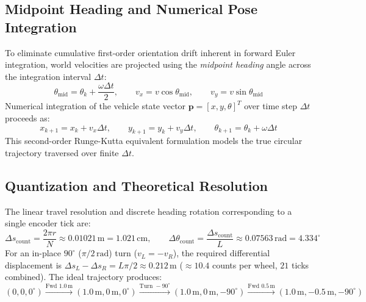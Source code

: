 \documentclass[11pt,a4paper]{article}
\begin{document}
\subsection{Midpoint Heading and Numerical Pose Integration}
To eliminate cumulative first-order orientation drift inherent in forward Euler integration, world velocities are projected using the \emph{midpoint heading} angle across the integration interval $\Delta t$:
\begin{equation}
    \theta_{\text{mid}} = \theta_k + \frac{\omega \Delta t}{2}, \qquad v_x = v \cos \theta_{\text{mid}}, \qquad v_y = v \sin \theta_{\text{mid}}
    \label{eq_midpoint}
\end{equation}
Numerical integration of the vehicle state vector $\mathbf{p} = [x, y, \theta]^T$ over time step $\Delta t$ proceeds as:
\begin{equation}
    x_{k+1} = x_k + v_x \Delta t, \qquad y_{k+1} = y_k + v_y \Delta t, \qquad \theta_{k+1} = \theta_k + \omega \Delta t
    \label{eq_pose_update}
\end{equation}
This second-order Runge-Kutta equivalent formulation models the true circular trajectory traversed over finite $\Delta t$.

\subsection{Quantization and Theoretical Resolution}
The linear travel resolution and discrete heading rotation corresponding to a single encoder tick are:
\begin{equation}
    \Delta s_{\text{count}} = \frac{2\pi r}{N} \approx 0.01021\,\text{m} = 1.021\,\text{cm}, \qquad \Delta \theta_{\text{count}} = \frac{\Delta s_{\text{count}}}{L} \approx 0.07563\,\text{rad} = 4.334^\circ
    \label{eq_resolution}
\end{equation}
For an in-place $90^\circ$ ($\pi/2\,\text{rad}$) turn ($v_L = -v_R$), the required differential displacement is $\Delta s_L - \Delta s_R = L \pi / 2 \approx 0.212\,\text{m}$ ($\approx 10.4$ counts per wheel, $21$ ticks combined). The ideal trajectory produces:
\begin{equation}
    (0, 0, 0^\circ) \xrightarrow{\text{Fwd } 1.0\,\text{m}} (1.0\,\text{m}, 0\,\text{m}, 0^\circ) \xrightarrow{\text{Turn } -90^\circ} (1.0\,\text{m}, 0\,\text{m}, -90^\circ) \xrightarrow{\text{Fwd } 0.5\,\text{m}} (1.0\,\text{m}, -0.5\,\text{m}, -90^\circ)
    \label{eq_waypoints}
\end{equation}
\end{document}
